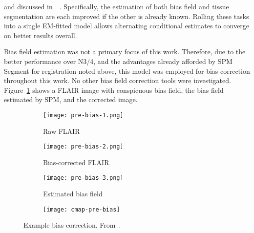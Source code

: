 and discussed in~~\cite{Ashburner2005}.
Specifically, the estimation of both bias field and tissue segmentation are each improved
if the other is already known.
Rolling these tasks into a single EM-fitted model allows
alternating conditional estimates to converge on better results overall.
\par
Bias field estimation was not a primary focus of this work.
Therefore, due to the better performance over N3/4,
and the advantages already afforded by SPM Segment for registration noted above,
this model was employed for bias correction throughout this work.
No other bias field correction tools were investigated.
Figure~\ref{fig:pre-bias} shows a FLAIR image with conspicuous bias field,
the bias field estimated by SPM, and the corrected image.
\par
\begin{figure}
  \centering
  \begin{subfigure}{0.3\textwidth}
    \centering
    \texttt{[image: pre-bias-1.png]}
    \caption{Raw FLAIR}
  \end{subfigure}
  \begin{subfigure}{0.3\textwidth}
    \centering
    \texttt{[image: pre-bias-2.png]}
    \caption{Bias-corrected FLAIR}
  \end{subfigure}
  \begin{subfigure}{0.30\textwidth}
    \centering
    \texttt{[image: pre-bias-3.png]}
    \caption{Estimated bias field}
  \end{subfigure}
  \begin{subfigure}{0.04\textwidth}
    \texttt{[image: cmap-pre-bias]}
    \\\vphantom{(x)}
  \end{subfigure}
  \caption{Example bias correction. From~\cite{WMHSEG2017}.}%
  \label{fig:pre-bias}
\end{figure}

